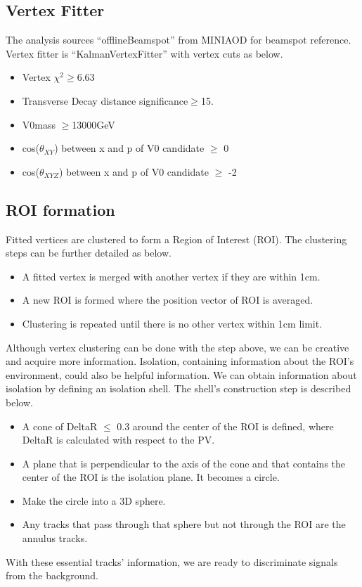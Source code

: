 \subsection{Vertex Fitter}\label{sec:ROI_V0Fitter}

The analysis sources ``offlineBeamspot'' from MINIAOD for beamspot reference.
Vertex fitter is ``KalmanVertexFitter'' with vertex cuts as below.
\begin{itemize}
  \item Vertex $\chi^{2}\geq$6.63 
  \item Transverse Decay distance significance$\geq$15.
  \item V0mass $\geq$13000GeV
  \item cos($\theta_{XY}$) between x and p of V0 candidate $\geq$ 0
  \item cos($\theta_{XYZ}$) between x and p of V0 candidate $\geq$ -2
\end{itemize}

\subsection{ROI formation}\label{sec:ROI_ROIformation}
Fitted vertices are clustered to form a Region of Interest (ROI).
The clustering steps can be further detailed as below.
\begin{itemize}
  \item A fitted vertex is merged with another vertex if they are within 1cm. 
  \item A new ROI is formed where the position vector of ROI is averaged.
  \item Clustering is repeated until there is no other vertex within 1cm limit.
\end{itemize}
Although vertex clustering can be done with the step above, we can be creative and acquire more information.
Isolation, containing information about the ROI's environment, could also be helpful information.
We can obtain information about isolation by defining an isolation shell.
The shell's construction step is described below.
\begin{itemize}
  \item A cone of DeltaR $\leq$ 0.3 around the center of the ROI is defined, where DeltaR is calculated with respect to the PV.
  \item A plane that is perpendicular to the axis of the cone and that contains the center of the ROI is the isolation plane. It becomes a circle. 
  \item Make the circle into a 3D sphere.
  \item Any tracks that pass through that sphere but not through the ROI are the annulus tracks.
\end{itemize}
With these essential tracks' information, we are ready to discriminate signals from the background.

